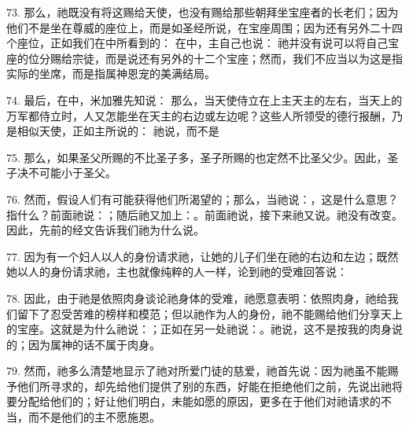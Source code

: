 73. 那么，祂既没有将这赐给天使，也没有赐给那些朝拜坐宝座者的长老们；因为他们不是坐在尊威的座位上，而是如圣经所说，在宝座周围；因为还有另外二十四个座位，正如我们在中所看到的： 在中，主自己也说： 祂并没有说可以将自己宝座的位分赐给宗徒，而是说还有另外的十二个宝座；然而，我们不应当以为这是指实际的坐席，而是指属神恩宠的美满结局。\par

74. 最后，在中，米加雅先知说： 那么，当天使侍立在上主天主的左右，当天上的万军都侍立时，人又怎能坐在天主的右边或左边呢？这些人所领受的德行报酬，乃是相似天使，正如主所说的：  祂说，而不是 \par

75. 那么，如果圣父所赐的不比圣子多，圣子所赐的也定然不比圣父少。因此，圣子决不可能小于圣父。\par

76. 然而，假设人们有可能获得他们所渴望的；那么，当祂说：，这是什么意思？指什么？前面祂说：；随后祂又加上：。前面祂说，接下来祂又说。祂没有改变。因此，先前的经文告诉我们祂为什么说。\par

77. 因为有一个妇人以人的身份请求祂，让她的儿子们坐在祂的右边和左边；既然她以人的身份请求祂，主也就像纯粹的人一样，论到祂的受难回答说：\par

78. 因此，由于祂是依照肉身谈论祂身体的受难，祂愿意表明：依照肉身，祂给我们留下了忍受苦难的榜样和模范；但以祂作为人的身份，祂不能赐给他们分享天上的宝座。这就是为什么祂说：；正如在另一处祂说：。祂说，这不是按我的肉身说的；因为属神的话不属于肉身。\par

79. 然而，祂多么清楚地显示了祂对所爱门徒的慈爱，祂首先说：因为祂虽不能赐予他们所寻求的，却先给他们提供了别的东西，好能在拒绝他们之前，先说出祂将要分配给他们的；好让他们明白，未能如愿的原因，更多在于他们对祂请求的不当，而不是他们的主不愿施恩。\par

